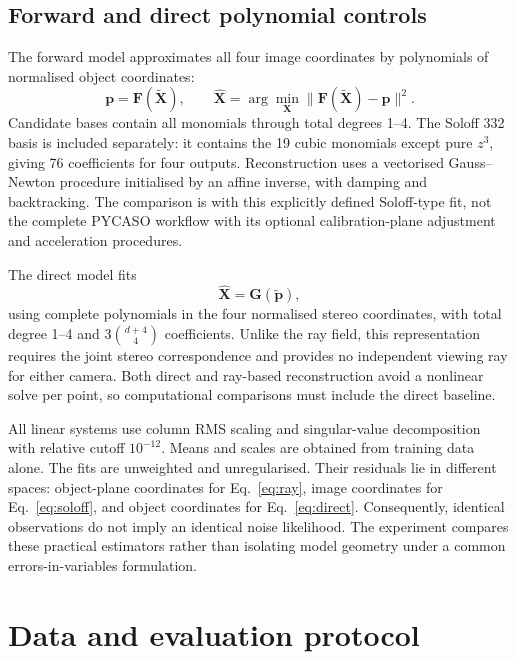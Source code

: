 \documentclass[10pt,a4paper]{article}
\begin{document}
\subsection{Forward and direct polynomial controls}
The forward model approximates all four image coordinates by polynomials of normalised object coordinates:
\begin{equation}
 \mathbf p=\mathbf F(\widetilde{\mathbf X}),\qquad
 \widehat{\mathbf X}=\arg\min_{\mathbf X}\|\mathbf F(\widetilde{\mathbf X})-\mathbf p\|^2.
 \label{eq:soloff}
\end{equation}
Candidate bases contain all monomials through total degrees 1--4. The Soloff 332 basis is included separately: it contains the 19 cubic monomials except pure $z^3$, giving 76 coefficients for four outputs. Reconstruction uses a vectorised Gauss--Newton procedure initialised by an affine inverse, with damping and backtracking. The comparison is with this explicitly defined Soloff-type fit, not the complete PYCASO workflow with its optional calibration-plane adjustment and acceleration procedures.

The direct model fits
\begin{equation}
 \widehat{\mathbf X}=\mathbf G(\widetilde{\mathbf p}),
 \label{eq:direct}
\end{equation}
using complete polynomials in the four normalised stereo coordinates, with total degree 1--4 and $3\binom{d+4}{4}$ coefficients. Unlike the ray field, this representation requires the joint stereo correspondence and provides no independent viewing ray for either camera. Both direct and ray-based reconstruction avoid a nonlinear solve per point, so computational comparisons must include the direct baseline.

All linear systems use column RMS scaling and singular-value decomposition with relative cutoff $10^{-12}$. Means and scales are obtained from training data alone. The fits are unweighted and unregularised. Their residuals lie in different spaces: object-plane coordinates for Eq.~\eqref{eq:ray}, image coordinates for Eq.~\eqref{eq:soloff}, and object coordinates for Eq.~\eqref{eq:direct}. Consequently, identical observations do not imply an identical noise likelihood. The experiment compares these practical estimators rather than isolating model geometry under a common errors-in-variables formulation.

\section{Data and evaluation protocol}
\end{document}
